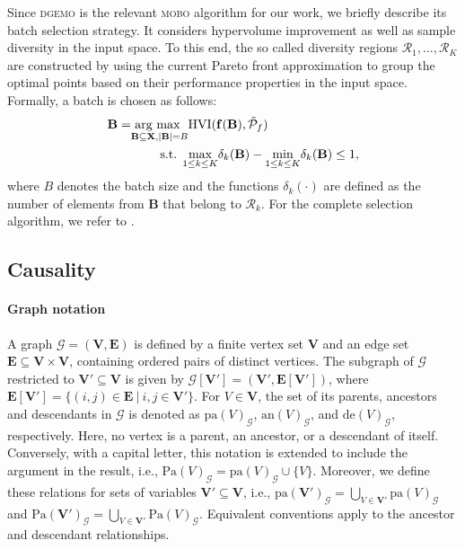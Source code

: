 Since \textsc{dgemo} \citep{dgemo} is the relevant \textsc{mobo} algorithm for our work, we briefly describe its batch selection strategy. It considers hypervolume improvement as well as sample diversity in the input space. To this end, the so called diversity regions $\mathcal{R}_1,\dots,\mathcal{R}_K$ are constructed by using the current Pareto front approximation to group the optimal points based on their performance properties in the input space. Formally, a batch is chosen as follows:
\begin{align}\label{eq:mo_cbo.dgemo_batch_selection}
    \mathbf{B} = &\underset{\mathbf{B} \subseteq \mathbf{X}, |\mathbf{B}| = B}{\text{arg max }} \text{HVI}(\mathbf{f}(\mathbf{B}), \tilde{\mathcal{P}}_f) \notag \\
    & \hspace{0.7cm} \text{ s.t. } \underset{1 \leq k \leq K}{\text{max}} \delta_k(\mathbf{B}) - \underset{1 \leq k \leq K}{\text{min}} \delta_k(\mathbf{B}) \leq 1,
\end{align}
where $B$ denotes the batch size and the functions $\delta_{k}(\cdot)$ are defined as the number of elements from $\mathbf{B}$ that belong to $\mathcal{R}_k$. For the complete selection algorithm, we refer to \citet{dgemo}.

\subsection{Causality}
\paragraph{Graph notation} A graph $\mathcal{G} = (\mathbf{V}, \mathbf{E})$ is defined by a finite vertex set $\mathbf{V}$ and an edge set $\mathbf{E} \subseteq \mathbf{V} \times \mathbf{V}$, containing ordered pairs of distinct vertices. The subgraph of $\mathcal{G}$ restricted to $\mathbf{V}' \subseteq \mathbf{V}$ is given by $\mathcal{G}[\mathbf{V}'] = ( \mathbf{V}', \mathbf{E}[\mathbf{V}'])$, where $\mathbf{E}[\mathbf{V}'] = \{(i,j) \in \mathbf{E} \ | \ i,j \in \mathbf{V}'\}$. 
For $V \in \mathbf{V}$, the set of its parents, ancestors and descendants in $\mathcal{G}$ is denoted as $\text{pa}(V)_{\mathcal{G}}$, $\text{an}(V)_{\mathcal{G}}$, and $\text{de}(V)_{\mathcal{G}}$, respectively. 
Here, no vertex is a parent, an ancestor, or a descendant of itself. 
Conversely, with a capital letter, this notation is extended to include the argument in the result, i.e., $\text{Pa}(V)_{\mathcal{G}} = \text{pa}(V)_{\mathcal{G}} \cup \{ V \}$. 
Moreover, we define these relations for sets of variables $\mathbf{V}' \subseteq \mathbf{V}$, i.e., $\text{pa}(\mathbf{V}')_{\mathcal{G}} = \bigcup_{V \in \mathbf{V'}} \text{pa}(V)_{\mathcal{G}}$ and $\text{Pa}(\mathbf{V}')_{\mathcal{G}} = \bigcup_{V \in \mathbf{V'}} \text{Pa}(V)_{\mathcal{G}}$. 
Equivalent conventions apply to the ancestor and descendant relationships.


